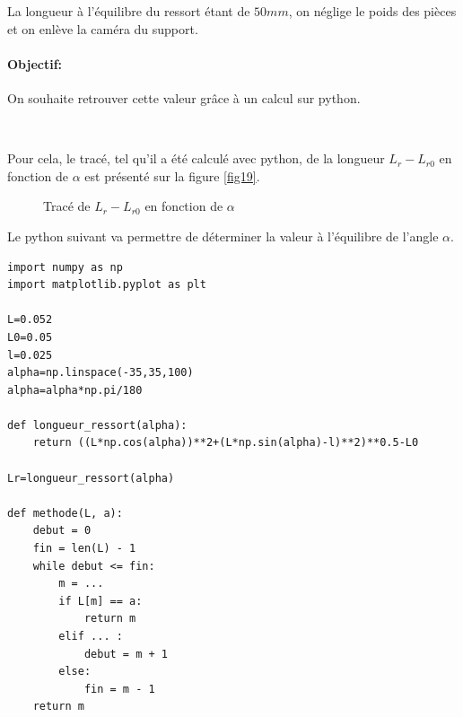 La longueur à l'équilibre du ressort étant de $50mm$, on néglige le poids des pièces et on enlève la caméra du support.


\paragraph{Objectif:} On souhaite retrouver cette valeur grâce à un calcul sur python.

~\

Pour cela, le tracé, tel qu'il a été calculé avec python, de la longueur $L_r-L_{r0}$ en fonction de $\alpha$ est présenté sur la figure \ref{fig19}.

\begin{figure}[ht!]
\begin{center}
  \resizebox{0.4\textwidth}{!}{}
\end{center}
\caption{Tracé de $L_r-L_{r0}$ en fonction de $\alpha$}
\label{figq19}
\end{figure}

\newpage

Le python suivant va permettre de déterminer la valeur à l'équilibre de l'angle $\alpha$.

\begin{verbatim}
import numpy as np
import matplotlib.pyplot as plt

L=0.052
L0=0.05
l=0.025
alpha=np.linspace(-35,35,100)
alpha=alpha*np.pi/180

def longueur_ressort(alpha):
    return ((L*np.cos(alpha))**2+(L*np.sin(alpha)-l)**2)**0.5-L0

Lr=longueur_ressort(alpha)

def methode(L, a):
    debut = 0
    fin = len(L) - 1
    while debut <= fin:
        m = ...
        if L[m] == a:
            return m
        elif ... :
            debut = m + 1
        else:
            fin = m - 1
    return m
\end{verbatim}




